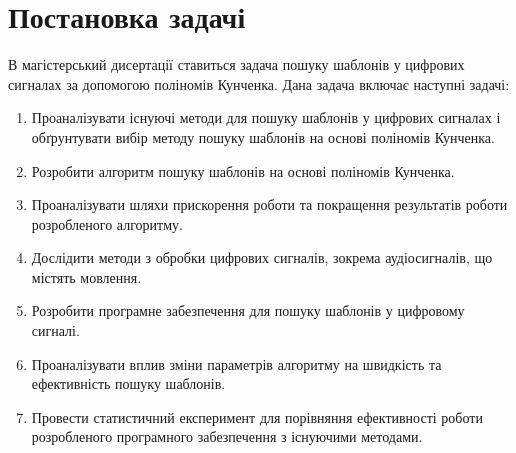 \chapter{Постановка задачі}

В магістерський дисертації ставиться задача пошуку шаблонів у цифрових сигналах за допомогою поліномів Кунченка.
Дана задача включає наступні задачі:

\begin{enumerate}[label=\arabic*. ]
    \item Проаналізувати існуючі методи для пошуку шаблонів у цифрових сигналах і обґрунтувати вибір методу пошуку
        шаблонів на основі поліномів Кунченка.
    \item Розробити алгоритм пошуку шаблонів на основі поліномів Кунченка.
    \item Проаналізувати шляхи прискорення роботи та покращення результатів роботи розробленого алгоритму.
    \item Дослідити методи з обробки цифрових сигналів, зокрема аудіосигналів, що містять мовлення.
    \item Розробити програмне забезпечення для пошуку шаблонів у цифровому сигналі.
    \item Проаналізувати вплив зміни параметрів алгоритму на швидкість та ефективність пошуку шаблонів.
    \item Провести статистичний експеримент для порівняння ефективності роботи розробленого програмного забезпечення з
        існуючими методами.
\end{enumerate}

